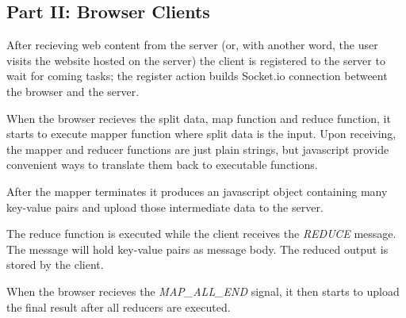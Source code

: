 \subsection{Part II: Browser Clients}

After recieving web content from the server (or, with another word, the user visits the website hosted on the server) the client is registered to the server to wait for coming tasks; the register action builds Socket.io connection betweent the browser and the server.

When the browser recieves the split data, map function and reduce function, it starts to execute mapper function where split data is the input. Upon receiving, the mapper and reducer functions are just plain strings, but javascript provide convenient ways to translate them back to executable functions.

After the mapper terminates it produces an javascript object containing many key-value pairs and upload those intermediate data to the server.

The reduce function is executed while the client receives the \emph{REDUCE} message. The message will hold key-value pairs as message body. The reduced output is stored by the client.

When the browser recieves the \emph{MAP_ALL_END} signal, it then starts to upload the final result after all reducers are executed.
